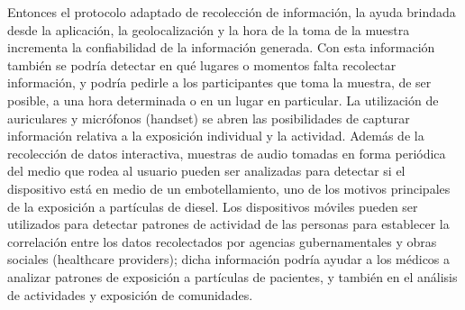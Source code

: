 	Entonces el protocolo adaptado de recolección de información, la ayuda brindada desde la aplicación, la geolocalización y la hora de la toma de la muestra incrementa la confiabilidad de la información generada. Con esta información también se podría detectar en qué lugares o momentos falta recolectar información, y podría pedirle a los participantes que toma la muestra, de ser posible, a una hora determinada o en un lugar en particular. La utilización de auriculares y micrófonos (handset) se abren las posibilidades de capturar información relativa a la exposición individual y la actividad. Además de la recolección de datos interactiva, muestras de audio tomadas en forma periódica del medio que rodea al usuario pueden ser analizadas para detectar si el dispositivo está en medio de un embotellamiento, uno de los motivos principales de la exposición a partículas de diesel. Los dispositivos móviles pueden ser utilizados para detectar patrones de actividad de las personas para establecer la correlación entre los datos recolectados por agencias gubernamentales y obras sociales (healthcare providers); dicha información podría ayudar a los médicos a analizar patrones de exposición a partículas de pacientes, y también en el análisis de actividades y exposición de comunidades. \cite{burke2006participatory}
	